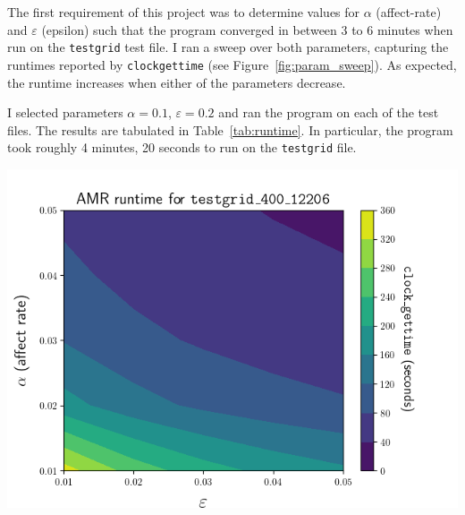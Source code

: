 \documentclass{article}
\begin{document}
The first requirement of this project was to determine values for $\alpha$
(affect-rate) and $\varepsilon$ (epsilon) such that the program converged in
between 3 to 6 minutes when run on the \texttt{testgrid} test file. I ran a sweep over both parameters,
capturing the runtimes reported by \texttt{clock\textunderscore gettime} (see
Figure~\ref{fig:param_sweep}). As expected, the runtime increases when either
of the parameters decrease.

I selected parameters $\alpha=0.1$, $\varepsilon=0.2$ and ran the program
on each of the test files. The results are tabulated in Table~\ref{tab:runtime}.
In particular, the program took roughly 4 minutes, 20 seconds to run on the
\texttt{testgrid} file.

\begin{minipage}{\linewidth}
    \centering
    \begin{minipage}{0.4\linewidth}

            \includegraphics[width=\linewidth]{../results/testgrid_400_12206_results.png}

            \label{fig:param_sweep}


\end{minipage}
\end{minipage}
\end{document}
